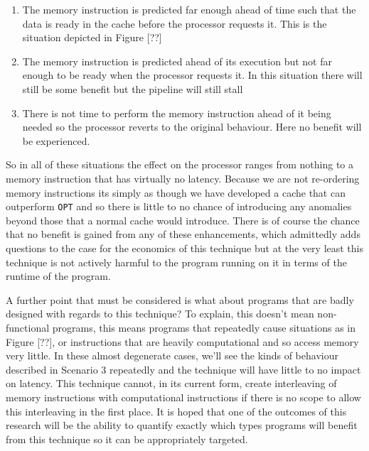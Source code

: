 \begin{enumerate}[label=\textbf{Situation \arabic*}]
	\item The memory instruction is predicted far enough ahead of time such that the data is ready in the cache before the processor requests it. This is the situation depicted in Figure [??]
	\item The memory instruction is predicted ahead of its execution but not far enough to be ready when the processor requests it. In this situation there will still be some benefit but the pipeline will still stall
	\item There is not time to perform the memory instruction ahead of it being needed so the processor reverts to the original behaviour. Here no benefit will be experienced.
\end{enumerate}

So in all of these situations the effect on the processor ranges from nothing to a memory instruction that has virtually no latency. Because we are not re-ordering memory instructions its simply as though we have developed a cache that can outperform \texttt{OPT} and so there is little to no chance of introducing any anomalies beyond those that a normal cache would introduce. There is of course the chance that no benefit is gained from any of these enhancements, which admittedly adds questions to the case for the economics of this technique but at the very least this technique is not actively harmful to the program running on it in terms of the runtime of the program. 

A further point that must be considered is what about programs that are badly designed with regards to this technique? To explain, this doesn't mean non-functional programs, this means programs that repeatedly cause situations as in Figure [??], or instructions that are heavily computational and so access memory very little. In these almost degenerate cases, we'll see the kinds of behaviour described in Scenario 3 repeatedly and the technique will have little to no impact on latency. This technique cannot, in its current form, create interleaving of memory instructions with computational instructions if there is no scope to allow this interleaving in the first place. It is hoped that one of the outcomes of this research will be the ability to quantify exactly which types programs will benefit from this technique so it can be appropriately targeted. 

